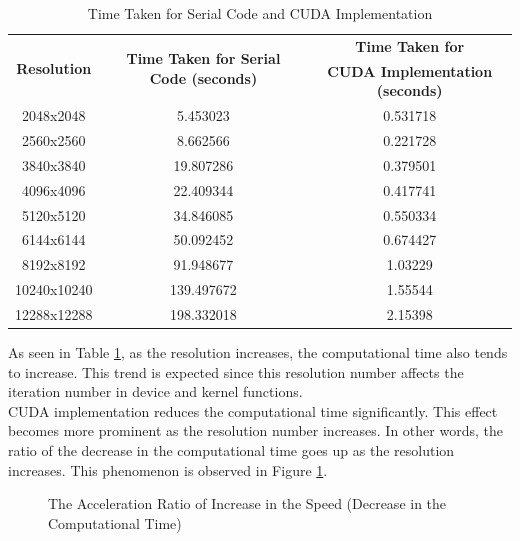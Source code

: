 \documentclass{article}
\begin{document}
\begin{table}[h]
    \centering
    \begin{tabular}{|c|c|c|}
        \hline
        \multirow{2}{*}{\textbf{Resolution}} & \multirow{2}{*}{\textbf{Time Taken for Serial Code (seconds)}} & \textbf{Time Taken for} \\
         &  & \textbf{CUDA Implementation (seconds)} \\
        \hline
        2048x2048    & 5.453023 & 0.531718    \\
        2560x2560    & 8.662566  & 0.221728   \\
        3840x3840    & 19.807286 & 0.379501     \\
        4096x4096   & 22.409344 & 0.417741  \\
        5120x5120   & 34.846085 & 0.550334  \\
        6144x6144   & 50.092452 & 0.674427  \\
        8192x8192   & 91.948677 & 1.03229  \\
        10240x10240 &  139.497672 & 1.55544 \\ 
        12288x12288 & 198.332018 & 2.15398 \\
        \hline
    \end{tabular}
    \caption{Time Taken for Serial Code and CUDA Implementation}
    \label{tab:time_results}
\end{table}
As seen in Table \ref{tab:time_results}, as the resolution increases, the computational time also tends to increase. This trend is expected since this resolution number affects the iteration number in device and kernel functions. \\

CUDA implementation reduces the computational time significantly. This effect becomes more prominent as the resolution number increases. In other words, the ratio of the decrease in the computational time goes up as the resolution increases. This phenomenon is observed in Figure \ref{t5}. \\

\begin{figure}[hbt!]
  \centering
  \caption{The Acceleration Ratio of Increase in the Speed (Decrease in the Computational Time)}
  \label{t5}
\end{figure}
\end{document}
